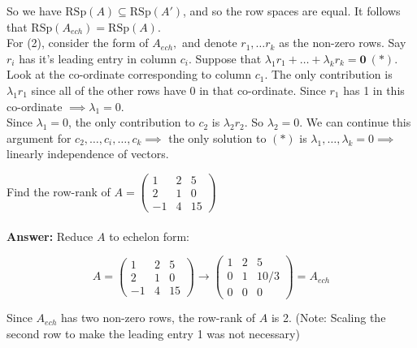 \documentclass[twoside]{scrartcl}
\begin{document}
So we have $\text{RSp}(A) \subseteq \text{RSp}(A')$, and so the row spaces are equal. It follows that $\text{RSp}(A_{ech}) = \text{RSp}(A)$.\\

For (2), consider the form of $A_{ech},$ and denote $r_1,\dots r_k$ as the non-zero rows. Say $r_i$ has it's leading entry in column $c_i$. Suppose that $\lambda_1r_1 + \dots + \lambda_kr_k = \mathbf{0} ~(*).$\\
  
  Look at the co-ordinate corresponding to column $c_1$. The only contribution is $\lambda_1r_1$ since all of the other rows have 0 in that co-ordinate. Since $r_1$ has 1 in this co-ordinate $\implies \lambda_1 = 0$.\\

Since $\lambda_1 = 0$, the only contribution to $c_2$ is $\lambda_2r_2$. So $\lambda_2 = 0$. We can continue this argument for $c_2, \dots, c_i, \dots, c_k \implies$ the only solution to $(*)$ is $\lambda_1, \dots, \lambda_k = 0 \implies $ linearly independence of vectors.
  

\begin{example}  
Find the row-rank of $A = \begin{pmatrix}
 1 & 2 & 5\\ 2 & 1 & 0 \\ -1& 4 & 15
 \end{pmatrix}
$ \\~\\

\noindent \textbf{Answer:} Reduce $A$ to echelon form: 

\[A  = \begin{pmatrix}
 1 & 2 & 5\\ 2 & 1 & 0 \\ -1& 4 & 15
 \end{pmatrix} \to \begin{pmatrix}
1 & 2 & 5 \\ 0 & 1 & 10/3 \\ 0 & 0 & 0
\end{pmatrix} = A_{ech}\]

Since $A_{ech}$ has two non-zero rows, the row-rank of $A$ is 2. (Note: Scaling the second row to make the leading entry 1 was not necessary)
\end{example}\vspace*{10pt}
\end{document}
